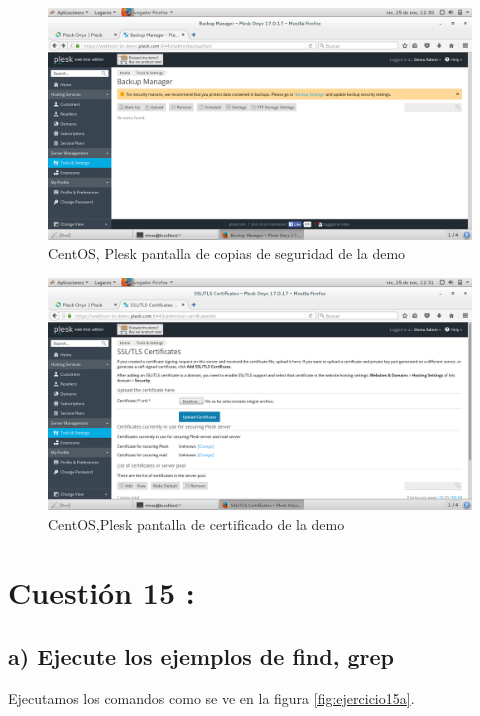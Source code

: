 \begin{figure}[H] 
	\centering
	\includegraphics[width=15cm]{./img/ejercicio14_5.png} 	
	\caption{CentOS, Plesk pantalla de copias de seguridad de la demo} \label{fig:ejercicio14_5}
\end{figure}

\begin{figure}[H] 
	\centering
	\includegraphics[width=15cm]{./img/ejercicio14_6.png} 	
	\caption{CentOS,Plesk pantalla de certificado de la demo} \label{fig:ejercicio14_6}
\end{figure}




\section{Cuestión 15 :}

\subsection{a) Ejecute los ejemplos de find, grep }
Ejecutamos los comandos como se ve en la figura \ref{fig:ejercicio15a}.

